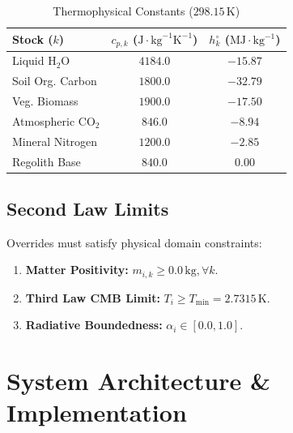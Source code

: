 \documentclass[twocolumn,10pt]{article}
\begin{document}
\begin{table}[h]
\centering
\caption{Thermophysical Constants ($298.15\,\text{K}$)}
\label{tab:constants}
\begin{tabular}{lcc}
\toprule
\textbf{Stock ($k$)} & \textbf{$c_{p,k}$ ($\text{J}\cdot\text{kg}^{-1}\text{K}^{-1}$)} & \textbf{$h_k^\circ$ ($\text{MJ}\cdot\text{kg}^{-1}$)} \\
\midrule
Liquid $\text{H}_2\text{O}$ & $4184.0$ & $-15.87$ \\
Soil Org. Carbon & $1800.0$ & $-32.79$ \\
Veg. Biomass & $1900.0$ & $-17.50$ \\
Atmospheric $\text{CO}_2$ & $846.0$ & $-8.94$ \\
Mineral Nitrogen & $1200.0$ & $-2.85$ \\
Regolith Base & $840.0$ & $0.00$ \\
\bottomrule
\end{tabular}
\end{table}

\subsection{Second Law Limits}
Overrides must satisfy physical domain constraints:
\begin{enumerate}
    \item \textbf{Matter Positivity:} $m_{i,k} \ge 0.0\,\text{kg}, \forall k$.
    \item \textbf{Third Law CMB Limit:} $T_i \ge T_{\text{min}} = 2.7315\,\text{K}$.
    \item \textbf{Radiative Boundedness:} $\alpha_i \in [0.0, 1.0]$.
\end{enumerate}

\section{System Architecture \& Implementation}
\end{document}
